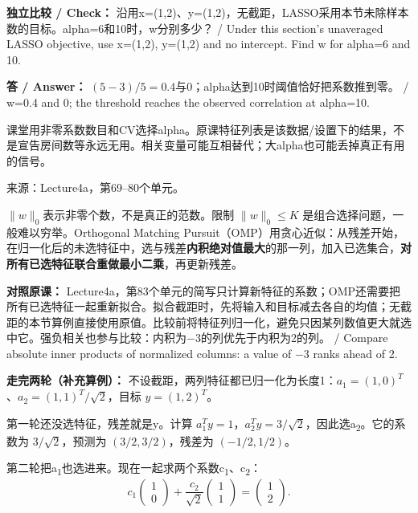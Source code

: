 \textbf{独立比较 / Check：} 沿用x=(1,2)、y=(1,2)，无截距，LASSO采用本节未除样本数的目标。alpha=6和10时，w分别多少？ / Under this section's unaveraged LASSO objective, use x=(1,2), y=(1,2) and no intercept. Find w for alpha=6 and 10.


\textbf{答 / Answer：} \((5-3)/5=0.4\)与0；alpha达到10时阈值恰好把系数推到零。 / w=0.4 and 0; the threshold reaches the observed correlation at alpha=10.


课堂用非零系数数目和CV选择alpha。原课特征列表是该数据/设置下的结果，不是宣告房间数等永远无用。相关变量可能互相替代；大alpha也可能丢掉真正有用的信号。


来源：Lecture4a，第69–80个单元。





\(\|w\|_0\)表示非零个数，不是真正的范数。限制 \(\|w\|_0\le K\) 是组合选择问题，一般难以穷举。Orthogonal Matching Pursuit（OMP）用贪心近似：从残差开始，在归一化后的未选特征中，选与残差\textbf{内积绝对值最大}的那一列，加入已选集合，\textbf{对所有已选特征联合重做最小二乘}，再更新残差。


\textbf{对照原课：} Lecture4a，第83个单元的简写只计算新特征的系数；OMP还需要把所有已选特征一起重新拟合。拟合截距时，先将输入和目标减去各自的均值；无截距的本节算例直接使用原值。比较前将特征列归一化，避免只因某列数值更大就选中它。强负相关也参与比较：内积为\ensuremath{-}3的列优先于内积为2的列。 / Compare absolute inner products of normalized columns: a value of \ensuremath{-}3 ranks ahead of 2.


\textbf{走完两轮（补充算例）：} 不设截距，两列特征都已归一化为长度1：\(a_1=(1,0)^T\)、\(a_2=(1,1)^T/\sqrt2\)，目标 \(y=(1,2)^T\)。


第一轮还没选特征，残差就是y。计算 \(a_1^Ty=1\)，\(a_2^Ty=3/\sqrt2\)，因此选a\textsubscript{2}。它的系数为 \(3/\sqrt2\)，预测为 \((3/2,3/2)\)，残差为 \((-1/2,1/2)\)。


第二轮把a\textsubscript{1}也选进来。现在一起求两个系数c\textsubscript{1}、c\textsubscript{2}：
\[
c_1\begin{pmatrix}1\\0\end{pmatrix}
+\frac{c_2}{\sqrt2}\begin{pmatrix}1\\1\end{pmatrix}
=\begin{pmatrix}1\\2\end{pmatrix}.\tag{4.14}
\]


